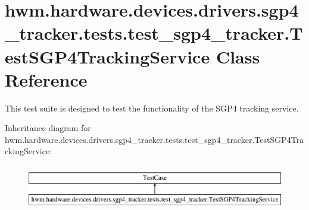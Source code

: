 \hypertarget{classhwm_1_1hardware_1_1devices_1_1drivers_1_1sgp4__tracker_1_1tests_1_1test__sgp4__tracker_1_1_test_s_g_p4_tracking_service}{\section{hwm.\-hardware.\-devices.\-drivers.\-sgp4\-\_\-tracker.\-tests.\-test\-\_\-sgp4\-\_\-tracker.\-Test\-S\-G\-P4\-Tracking\-Service Class Reference}
\label{classhwm_1_1hardware_1_1devices_1_1drivers_1_1sgp4__tracker_1_1tests_1_1test__sgp4__tracker_1_1_test_s_g_p4_tracking_service}
}


This test suite is designed to test the functionality of the S\-G\-P4 tracking service.  


Inheritance diagram for hwm.\-hardware.\-devices.\-drivers.\-sgp4\-\_\-tracker.\-tests.\-test\-\_\-sgp4\-\_\-tracker.\-Test\-S\-G\-P4\-Tracking\-Service\-:\begin{figure}[H]
\begin{center}
\leavevmode
\includegraphics[height=2.000000cm]{classhwm_1_1hardware_1_1devices_1_1drivers_1_1sgp4__tracker_1_1tests_1_1test__sgp4__tracker_1_1_test_s_g_p4_tracking_service}
\end{center}
\end{figure}
